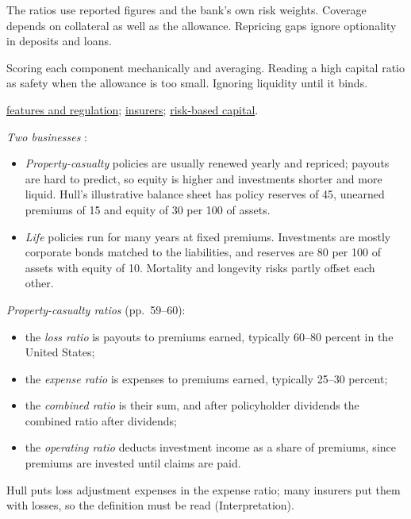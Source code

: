 \begin{qfmethod}
 The ratios use reported figures and the bank's own risk weights. Coverage depends on collateral as well as the allowance. Repricing gaps ignore optionality in deposits and loans.

 Scoring each component mechanically and averaging. Reading a high capital ratio as safety when the allowance is too small. Ignoring liquidity until it binds.

 \hyperref[def:financial-institution-features]{features and regulation}; \hyperref[meth:insurer-analysis]{insurers}; \hyperref[meth:market-risk-limits-capital]{risk-based capital}.

\end{qfmethod}

\begin{qfmethod}\label{meth:insurer-analysis}
 \emph{Two businesses} \citep[pp.~57--64]{risk-management-financial-institutions-2023}:
\begin{itemize}
\item \emph{Property-casualty} policies are usually renewed yearly and repriced; payouts are hard to predict, so equity is higher and investments shorter and more liquid. Hull's illustrative balance sheet has policy reserves of 45, unearned premiums of 15 and equity of 30 per 100 of assets.
\item \emph{Life} policies run for many years at fixed premiums. Investments are mostly corporate bonds matched to the liabilities, and reserves are 80 per 100 of assets with equity of 10. Mortality and longevity risks partly offset each other.
\end{itemize}

\emph{Property-casualty ratios} (pp.~59--60):
\begin{itemize}
\item the \emph{loss ratio} is payouts to premiums earned, typically 60--80 percent in the United States;
\item the \emph{expense ratio} is expenses to premiums earned, typically 25--30 percent;
\item the \emph{combined ratio} is their sum, and after policyholder dividends the combined ratio after dividends;
\item the \emph{operating ratio} deducts investment income as a share of premiums, since premiums are invested until claims are paid.
\end{itemize}
Hull puts loss adjustment expenses in the expense ratio; many insurers put them with losses, so the definition must be read (Interpretation).


\end{qfmethod}
